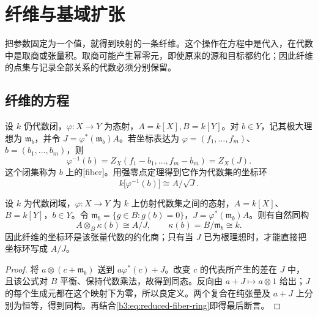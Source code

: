 
\section{纤维与基域扩张}
\label{b3:sec:0703}

把参数固定为一个值，就得到映射的一条纤维。这个操作在方程中是代入，在代数中是取商或张量积。取商可能产生幂零元，即使原来的源和目标都约化；因此纤维的点集与记录全部关系的代数必须分别保留。

\subsection{纤维的方程}
\label{b3:subsec:0703:01}

设 \(k\) 仍代数闭，\(\varphi:X\to Y\) 为态射，\(A=k[X],B=k[Y]\)。对 \(b\in Y\)，记其极大理想为 \(\mathfrak m_b\)，并令 \(J=\varphi^*(\mathfrak m_b)A\)。若坐标表达为 \(\varphi=(f_1,\ldots,f_m)\)、\(b=(b_1,\ldots,b_m)\)，则
\[
	\varphi^{-1}(b)=Z_X(f_1-b_1,\ldots,f_m-b_m)=Z_X(J).
\]
这个闭集称为 \(b\) 上的[fiber]。用强零点定理得到它作为代数集的坐标环
\begin{equation}\label{b3:eq:reduced-fiber-ring}
	k\bigl[\varphi^{-1}(b)\bigr]\cong A/\sqrt J.
\end{equation}

\begin{proposition}\label{b3:prop:fiber-algebra}
	设 \(k\) 为代数闭域，\(\varphi:X\to Y\) 为 \(k\) 上仿射代数集之间的态射，\(A=k[X]\)、\(B=k[Y]\)，\(b\in Y\)。令 \(\mathfrak m_b=\{g\in B:g(b)=0\}\)，\(J=\varphi^*(\mathfrak m_b)A\)。则有自然同构
	\[
		A\otimes_B\kappa(b)\cong A/J, \qquad \kappa(b)=B/\mathfrak m_b\cong k.
	\]
	因此纤维的坐标环是该张量代数的约化商；只有当 \(J\) 已为根理想时，才能直接把坐标环写成 \(A/J\)。
\end{proposition}
\begin{proof}
	将 \(a\otimes(c+\mathfrak m_b)\) 送到 \(a\varphi^*(c)+J\)。改变 \(c\) 的代表所产生的差在 \(J\) 中，且该公式对 \(B\) 平衡、保持代数乘法，故得到同态。反向由 \(a+J\mapsto a\otimes1\) 给出；\(J\) 的每个生成元都在这个映射下为零，所以良定义。两个复合在纯张量及 \(a+J\) 上分别为恒等，得到同构。再结合\eqref{b3:eq:reduced-fiber-ring}即得最后断言。
\end{proof}

